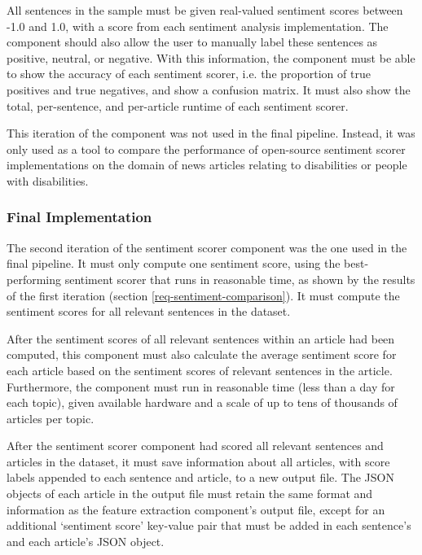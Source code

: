 \documentclass{report}
\begin{document}
All sentences in the sample must be given real-valued sentiment scores between -1.0 and 1.0, with a score from each sentiment analysis implementation.
The component should also allow the user to manually label these sentences as positive, neutral, or negative.
With this information, the component must be able to show the accuracy of each sentiment scorer, i.e. the proportion of true positives and true negatives, and show a confusion matrix.
It must also show the total, per-sentence, and per-article runtime of each sentiment scorer.

This iteration of the component was not used in the final pipeline.
Instead, it was only used as a tool to compare the performance of open-source sentiment scorer implementations on the domain of news articles relating to disabilities or people with disabilities.

\subsubsection{Final Implementation} \label{req-sentiment-final}

The second iteration of the sentiment scorer component was the one used in the final pipeline.
It must only compute one sentiment score, using the best-performing sentiment scorer that runs in reasonable time, as shown by the results of the first iteration (section \ref{req-sentiment-comparison}).
It must compute the sentiment scores for all relevant sentences in the dataset.

After the sentiment scores of all relevant sentences within an article had been computed, this component must also calculate the average sentiment score for each article based on the sentiment scores of relevant sentences in the article.
Furthermore, the component must run in reasonable time (less than a day for each topic), given available hardware and a scale of up to tens of thousands of articles per topic.

After the sentiment scorer component had scored all relevant sentences and articles in the dataset, it must save information about all articles, with score labels appended to each sentence and article, to a new output file.
The JSON objects of each article in the output file must retain the same format and information as the feature extraction component's output file, except for an additional `sentiment score' key-value pair that must be added in each sentence's and each article's JSON object.
\end{document}
